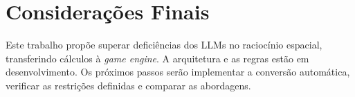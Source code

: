 \documentclass[
  12pt,
  a4paper,
  oneside,
  article,
  brazil
]{abntex2}
\begin{document}
\section{Considerações Finais}

Este trabalho propõe superar deficiências dos LLMs no raciocínio espacial, transferindo cálculos à \textit{game engine}. A arquitetura e as regras estão em desenvolvimento. Os próximos passos serão implementar a conversão automática, verificar as restrições definidas e comparar as abordagens.

\SingleSpacing
\printbibliography[title={Referências}]
\end{document}
